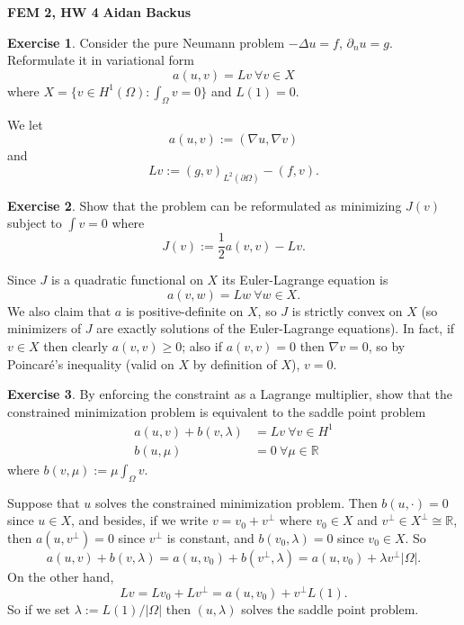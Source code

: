 \documentclass[10pt]{article}
\newcommand{\RR}{\mathbb{R}}
\theoremstyle{definition}
\newtheorem{exer}{Exercise}
\begin{document}
\noindent
\large\textbf{FEM 2, HW 4} \hfill \textbf{Aidan Backus} \\

\begin{exer}
Consider the pure Neumann problem $-\Delta u = f$, $\partial_n u = g$.
Reformulate it in variational form
$$a(u, v) = Lv ~\forall v \in X$$
where $X = \{v \in H^1(\Omega): \int_\Omega v = 0\}$ and $L(1) = 0$.
\end{exer}

We let
$$a(u, v) := (\nabla u, \nabla v)$$
and
$$Lv := (g, v)_{L^2(\partial \Omega)} - (f, v).$$

\begin{exer}
Show that the problem can be reformulated as minimizing $J(v)$ subject to $\int v = 0$ where
$$J(v) := \frac{1}{2} a(v, v) - Lv.$$
\end{exer}

Since $J$ is a quadratic functional on $X$ its Euler-Lagrange equation is
$$a(v, w) = Lw ~\forall w \in X.$$
We also claim that $a$ is positive-definite on $X$, so $J$ is strictly convex on $X$ (so minimizers of $J$ are exactly solutions of the Euler-Lagrange equations).
In fact, if $v \in X$ then clearly $a(v, v) \geq 0$; also if $a(v, v) = 0$ then $\nabla v = 0$, so by Poincar\'e's inequality (valid on $X$ by definition of $X$), $v = 0$.

\begin{exer}
By enforcing the constraint as a Lagrange multiplier, show that the constrained minimization problem is equivalent to the saddle point problem
\begin{align*}
a(u, v) + b(v, \lambda) &= Lv ~\forall v \in H^1\\
b(u, \mu) &= 0 ~\forall \mu \in \RR
\end{align*}
where $b(v, \mu) := \mu \int_\Omega v$.
\end{exer}

Suppose that $u$ solves the constrained minimization problem. Then $b(u, \cdot) = 0$ since $u \in X$, and besides, if we write $v = v_0 + v^\perp$ where $v_0 \in X$ and $v^\perp \in X^\perp \cong \RR$, then $a(u, v^\perp) = 0$ since $v^\perp$ is constant, and $b(v_0, \lambda) = 0$ since $v_0 \in X$.
So
$$a(u, v) + b(v, \lambda) = a(u, v_0) + b(v^\perp, \lambda) = a(u, v_0) + \lambda v^\perp |\Omega|.$$
On the other hand,
$$Lv = Lv_0 + Lv^\perp = a(u, v_0) + v^\perp L(1).$$
So if we set $\lambda := L(1)/|\Omega|$ then $(u, \lambda)$ solves the saddle point problem.
\end{document}
